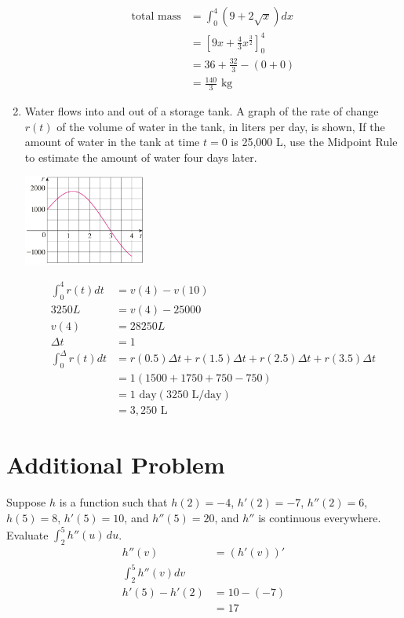 \documentclass{article}
\begin{document}
\begin{enumerate}
	$$\begin{align}
		\text{total mass}&=\int_{0}^{4}(9+2\sqrt{x})dx\\
		&=\left[9x+\frac{4}{3}x^{\frac{3}{2}}\right]_0^4\\
		&=36+\frac{32}{3}-(0+0)\\
		&=\frac{140}{3}\text{ kg}
	\end{align}$$
\setcounter{enumi}{67}
	\item Water flows into and out of a storage tank. A graph of the rate of change $r(t)$ of the volume of water in the tank, in liters per day, is shown, If the amount of water in the tank at time $t=0$ is 25,000 L, use the Midpoint Rule to estimate the amount of water four days later.
	\begin{center}
		\includegraphics[width=4cm]{images/53pr58}
	\end{center}
	$$\begin{align}
		\int_{0}^{4}r(t)dt&= v(4)-v(10)\\
		3250L&=v(4)-25000\\
		v(4)&=28250L\\
		\Delta t &= 1\\
		\int_{0}^{\Delta}r(t)dt&=r(0.5)\Delta t + r(1.5)\Delta t + r(2.5)\Delta t + r(3.5)\Delta t\\
		&=1(1500+1750+750-750)\\
		&=1\text{ day}(3250\text{ L/day})\\
		&=\boxed{3,250\text{ L}}
	\end{align}$$
\end{enumerate}

\section{Additional Problem}
Suppose \(h\) is a function such that \(h(2)=-4\), \(h'(2)=-7\), \(h''(2)=6\), \(h(5)=8\), \(h'(5)=10\), and \(h''(5)=20\), and \(h''\) is continuous everywhere. Evaluate \(\int_2^5h''(u)\,du\).
$$\begin{align}
	h''(v)&= (h'(v))'\\
	\int_2^5 h''(v)dv\\
	h'(5)-h'(2)&=10-(-7)\\
	&= \boxed{17}
\end{align}$$
\end{document}
